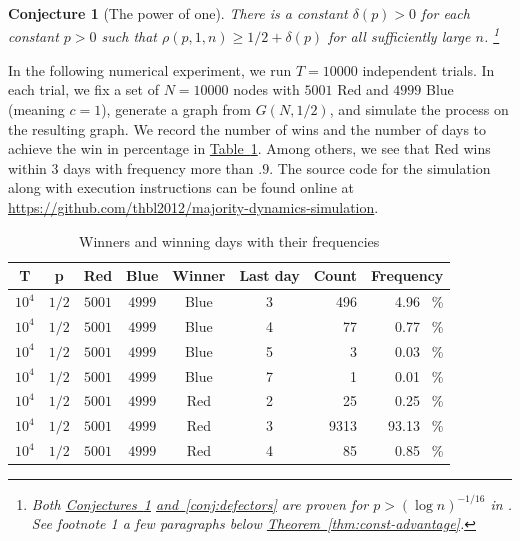 \documentclass[11pt]{article}
\numberwithin{equation}{section}
\newtheorem{conjecture}[theorem]{Conjecture}
\theoremstyle{definition}
\theoremstyle{plain}
\newcommand{\expref}[2]{\hyperref[#2]{#1~\ref{#2}}}
\begin{document}
			\begin{conjecture}[The power of one] \label{conj:advantage-1}
				There is a constant $\delta(p) > 0$ for each constant $p > 0$ such that  $\rho (p, 1, n) \ge 1/2 + \delta(p)$ for all sufficiently large $n$.
				\footnote[1]{Both \expref{Conjectures}{conj:advantage-1} \expref{and}{conj:defectors} are proven for $p > (\log n)^{-1/16}$ in \cite{sahsawhney2021}. See footnote 1 a few paragraphs below \expref{Theorem}{thm:const-advantage}.}
			\end{conjecture}
			
			In the following numerical experiment,  we run $T = 10000$ independent trials.  In each trial, we  fix a set of $N = 10000$ nodes with $5001$ Red and $4999$  Blue (meaning $c=1$), generate a graph from $G(N, 1/2)$,  and simulate the process on the resulting graph. We record the number of wins  and the number of days to achieve the win in percentage  in \expref{Table}{tab:voting-sim}. Among others, we see that Red wins within $3$ days with frequency more than $.9$.
			The source code for the simulation along with execution
			instructions can be found online at \url{https://github.com/thbl2012/majority-dynamics-simulation}.
			\begin{table}[h]
				\centering
				
				\begin{tabular}{|ccccccrr|}\hline
					T & p & Red & Blue & 	Winner & Last day & Count & Frequency \\
					\hline
					$10^4$ & $1/2$ & $5001$ & $4999$ &	Blue & 3 & 496 & 4.96 \ \% \\
					$10^4$ & $1/2$ & $5001$ & $4999$ &	Blue & 4 & 77 & 0.77 \ \% \\
					$10^4$ & $1/2$ & $5001$ & $4999$ &	Blue & 5 & 3 & 0.03 \ \% \\
					$10^4$ & $1/2$ & $5001$ & $4999$ &	Blue & 7 & 1 & 0.01 \ \% \\
					$10^4$ & $1/2$ & $5001$ & $4999$ &	Red & 2 & 25 & 0.25 \ \% \\
					$10^4$ & $1/2$ & $5001$ & $4999$ &	Red & 3 & 9313 & 93.13 \ \% \\
					$10^4$ & $1/2$ & $5001$ & $4999$ &	Red & 4 & 85 & 0.85 \ \% \\
					\hline
				\end{tabular}
				\vspace{3pt}
				
				\caption{Winners and winning days with their frequencies}
				\label{tab:voting-sim}
			\end{table}
			
\end{document}
